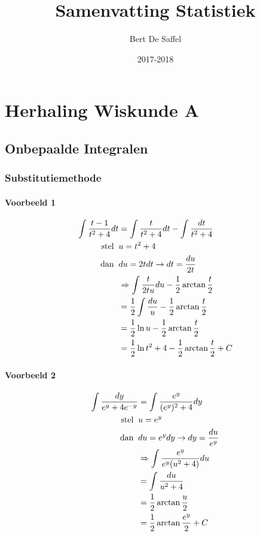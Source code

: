 \documentclass[12pt]{report}
\title{Samenvatting Statistiek}
\author{Bert De Saffel}
\date{2017-2018}
\begin{document}
\maketitle
\tableofcontents
 
\part{Herhaling Wiskunde A}
\chapter{Onbepaalde Integralen}
\section{Substitutiemethode}
\subsection{Voorbeeld 1}
\begin{equation*}
	\begin{split}
		\int \frac{t - 1}{t^2 + 4}dt & = \int \frac{t}{t^2 + 4}dt - \int \frac{dt}{t^2 + 4} \\
		\hbox{stel}\;\; &  u = t^2 + 4        \\
		\hbox{dan}\;\; & du = 2tdt \rightarrow dt = \frac{du}{2t} \\
		& \Rightarrow \int \frac{t}{2t u} du - \frac{1}{2}\arctan{\frac{t}{2}} \\
		& = \frac{1}{2}\int \frac{du}{u} - \frac{1}{2}\arctan{\frac{t}{2}}\\
		& = \frac{1}{2}\ln{u} - \frac{1}{2}\arctan{\frac{t}{2}} \\
		& =  \frac{1}{2}\ln{t^2 + 4} - \frac{1}{2}\arctan{\frac{t}{2}} + C
	\end{split}
\end{equation*}
\subsection{Voorbeeld 2}
\begin{equation*}
	\begin{split}
		\int \frac{dy}{e^y + 4e^{-y}} & = \int \frac{e^y}{(e^y)^2 + 4} dy \\
		\hbox{stel}\;\; & u = e^y \\
		\hbox{dan}\;\; & du = e^ydy \rightarrow dy = \frac{du}{e^y}\\
		& \Rightarrow \int \frac{e^y}{e^y(u^2 + 4)} du \\
		& = \int \frac{du}{u^2 + 4} \\
		& = \frac{1}{2}\arctan{\frac{u}{2}}\\
		& = \frac{1}{2}\arctan{\frac{e^y}{2}} + C\\
	\end{split}
\end{equation*}
\end{document}
